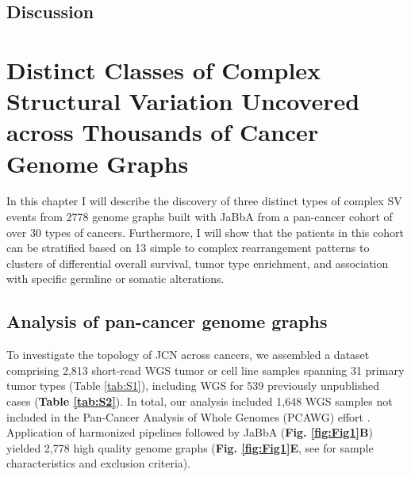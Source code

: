 \documentclass[phd,tocprelim]{cornell}
\renewcommand{\caption}[1]{\singlespacing\hangcaption{#1}\normalspacing}
\begin{document}
\section{Discussion}

\chapter{Distinct Classes of Complex Structural Variation Uncovered across Thousands of Cancer Genome Graphs} \label{chap:complex_events}
In this chapter I will describe the discovery of three distinct types of complex SV events from 2778 genome graphs built with JaBbA from a pan-cancer cohort of over 30 types of cancers. Furthermore, I will show that the patients in this cohort can be stratified based on 13 simple to complex rearrangement patterns to clusters of differential overall survival, tumor type enrichment, and association with specific germline or somatic alterations.

\section{Analysis of pan-cancer genome graphs}
To investigate the topology of JCN across cancers, we assembled a dataset comprising 2,813 short-read WGS tumor or cell line samples spanning 31 primary tumor types (Table \ref{tab:S1}), including WGS for 539 previously unpublished cases  (\textbf{Table \ref{tab:S2}}). In total, our analysis included 1,648 WGS samples not included in the Pan-Cancer Analysis of Whole Genomes (PCAWG) effort \cite{pcawg_marker2020-yi}.  Application of harmonized pipelines followed by JaBbA (\textbf{Fig. \ref{fig:Fig1}B}) yielded 2,778 high quality genome graphs (\textbf{Fig. \ref{fig:Fig1}E}, see  for sample characteristics and exclusion criteria). 


\end{document}
